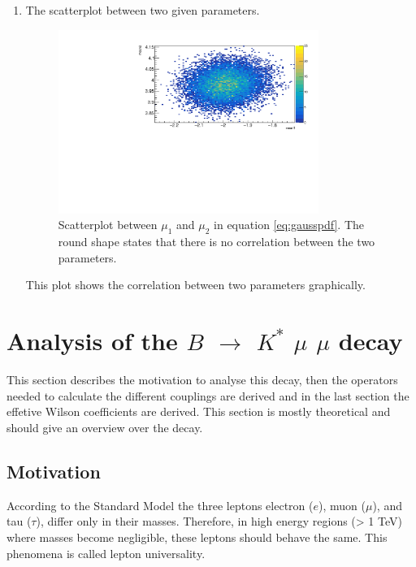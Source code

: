 \documentclass[english]{uzhpub}
\begin{document}
\begin{enumerate}
  \item The scatterplot between two given parameters.
  \begin{figure}[H]
    \centering
    \includegraphics[width=0.8\textwidth]{RooMCMC/scatter}
    \caption{Scatterplot between $\mu_1$ and $\mu_2$ in equation \ref{eq:gausspdf}. The round shape states that there is no correlation between the two parameters.}
    \label{fig:scatter}
  \end{figure}
  This plot shows the correlation between two parameters graphically.
\end{enumerate}


\section{Analysis of the $B$ $\rightarrow$ $K^{*}$ $\mu$ $\mu$ decay}

This section describes the motivation to analyse this decay, then the operators needed to calculate the different couplings are derived and in the last section the effetive Wilson coefficients are derived. This section is mostly theoretical and should give an overview over the decay.

\subsection{Motivation} \label{sec:Motivation}
According to the Standard Model the three leptons electron ($e$), muon ($\mu$), and  tau ($\tau$),  differ only in their masses. Therefore, in high energy regions (> 1 TeV) where masses become negligible, these leptons should behave the same. This phenomena is called lepton universality.
\end{document}
